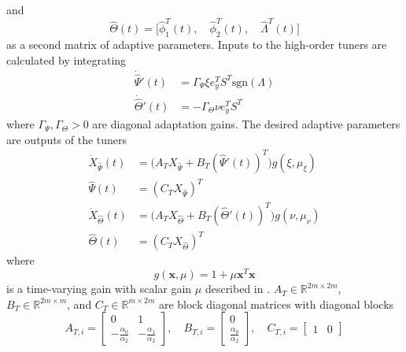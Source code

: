 \documentclass[english]{ifacconf}
\begin{document}
and 
\begin{equation}
\hat{\Theta}(t) = \big[ \hat{\phi}_1^T(t),\quad \hat{\phi}_2^T(t),\quad \hat{\Lambda}^T(t) \big]
\end{equation}
as a second matrix of adaptive parameters. Inputs to the high-order tuners are calculated by integrating
\begin{equation}
\begin{aligned}
\dot{\hat{\Psi}}'(t) &= \Gamma_{\Psi} \xi e_y^T S^T \text{sgn}(\Lambda) \\
\dot{\hat{\Theta}}'(t) &= -\Gamma_{\Theta} \nu e_y^T S^T
\end{aligned}
\end{equation}
where $\Gamma_{\Psi}, \Gamma_{\Theta} > 0$ are diagonal adaptation gains. The desired adaptive parameters are outputs of the tuners
\begin{equation}
\begin{aligned}
	\dot{X}_{\hat{\Psi}}(t) &= \big( A_T X_{\hat{\Psi}} + B_T (\hat{\Psi}'(t))^T \big) g(\xi, \mu_{\xi}) \\
	\hat{\Psi}(t) &= (C_T X_{\hat{\Psi}})^T \\
	\dot{X}_{\hat{\Theta}}(t) &= \big( A_T X_{\hat{\Theta}} + B_T (\hat{\Theta}'(t))^T \big) g(\nu, \mu_{\nu}) \\
	\hat{\Theta}(t) &= (C_T X_{\hat{\Theta}})^T
\end{aligned}	
\end{equation}
where
\begin{equation}
g(\mathbf{x}, \mu) = 1 + \mu \mathbf{x}^T \mathbf{x}	
\end{equation}
is a time-varying gain with scalar gain $\mu$ described in \cite{qu2016phd}. $A_T \in \mathbb{R}^{2m \times 2m}$, $B_T \in \mathbb{R}^{2m \times m}$, and $C_T \in \mathbb{R}^{m \times 2m}$ are block diagonal matrices with diagonal blocks
\begin{equation}
A_{T,i} = \begin{bmatrix}
	0 & 1\\ -\frac{\alpha_0}{\alpha_2} & -\frac{\alpha_1}{\alpha_2}
\end{bmatrix}, \quad B_{T,i} = \begin{bmatrix}
	0 \\ \frac{\alpha_0}{\alpha_2}
\end{bmatrix}, \quad C_{T,i} = \begin{bmatrix}
	1 & 0
\end{bmatrix}
\end{equation}
\end{document}
